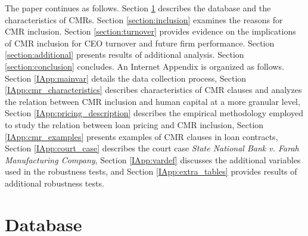 \documentclass[a4paper,12pt]{article}
\begin{document}
The paper continues as follows.
Section \ref{section:database} describes the database and the characteristics of CMRs.
Section \ref{section:inclusion} examines the reasons for CMR inclusion.
Section \ref{section:turnover} provides evidence on the implications of CMR inclusion for CEO turnover and future firm performance.
Section \ref{section:additional} presents results of additional analysis.
Section \ref{section:conclusion} concludes.
An Internet Appendix is organized as follows.
Section \ref{IApp:mainvar} details the data collection process,
Section \ref{IApp:cmr_characteristics} describes characteristics of CMR clauses and analyzes the relation between CMR inclusion and human capital at a more granular level,
Section \ref{IApp:pricing_description} describes the empirical methodology employed to study the relation between loan pricing and CMR inclusion,
Section \ref{IApp:cmr_examples} presents examples of CMR clauses in loan contracts,
Section \ref{IApp:court_case} describes the court case \textit{State National Bank v. Farah Manufacturing Company},
Section \ref{IApp:vardef} discusses the additional variables used in the robustness tests,
and Section \ref{IApp:extra_tables} provides results of additional robustness tests.








\section{Database}
\label{section:database}
\end{document}
